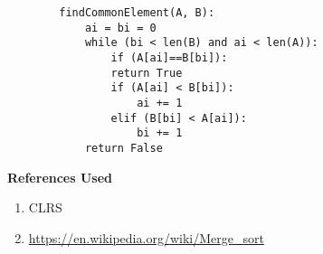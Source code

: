 \documentclass[12pt]{article}
\begin{document}
\begin{enumerate}
\begin{enumerate}
		\begin{verbatim}
		findCommonElement(A, B):
		    ai = bi = 0
		    while (bi < len(B) and ai < len(A)):
		        if (A[ai]==B[bi]):
		        return True
		        if (A[ai] < B[bi]):
		            ai += 1
		        elif (B[bi] < A[ai]):
		            bi += 1
		    return False
		\end{verbatim}


	\end{enumerate}

\end{enumerate}

\newpage

\textbf{References Used}

\hrulefill

\begin{enumerate}
	\item CLRS
	\item \url{https://en.wikipedia.org/wiki/Merge_sort}
\end{enumerate}
\end{document}
